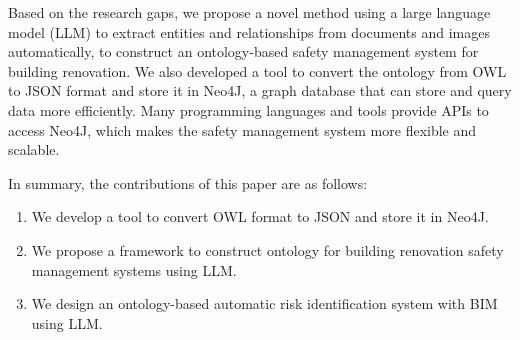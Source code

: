 Based on the research gaps, we propose a novel method using a large language model (LLM) to extract entities and relationships from documents and images automatically,
to construct an ontology-based safety management system for building renovation.
We also developed a tool to convert the ontology from OWL to JSON format and store it in Neo4J, a graph database that can store and query data more efficiently.
Many programming languages and tools provide APIs to access Neo4J, which makes the safety management system more flexible and scalable.

In summary, the contributions of this paper are as follows:
\begin{enumerate}
    \item We develop a tool to convert OWL format to JSON and store it in Neo4J.
    \item We propose a framework to construct ontology for building renovation safety management systems using LLM.
    \item We design an ontology-based automatic risk identification system with BIM using LLM.
\end{enumerate}


